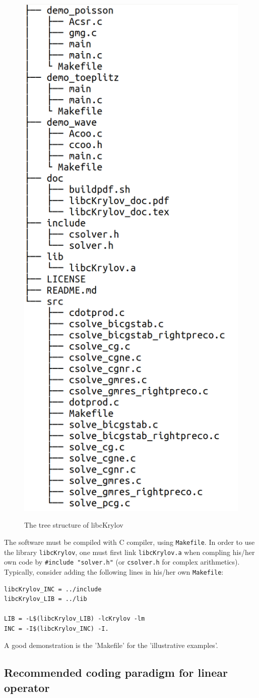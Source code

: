 \documentclass[10pt]{article}
\begin{document}
\begin{figure}
  \centering
  \includegraphics[width=0.5\linewidth]{list.png}\label{fig:diagram}
  \caption{The tree structure of libcKrylov}
\end{figure}


The software must be compiled with C compiler, using \verb|Makefile|. In order to use the library \verb|libcKrylov|, one must first link \verb|libcKrylov.a| when compling his/her own code by  \verb|#include "solver.h"| (or \verb|csolver.h| for complex arithmetics). Typically, consider adding the following lines in his/her own \verb|Makefile|:
\begin{verbatim} 
libcKrylov_INC = ../include
libcKrylov_LIB = ../lib

LIB = -L$(libcKrylov_LIB) -lcKrylov -lm 
INC = -I$(libcKrylov_INC) -I. 
\end{verbatim}
A good demonstration is the 'Makefile' for the 'illustrative examples'.


\subsection{Recommended coding paradigm for linear operator}
\end{document}
